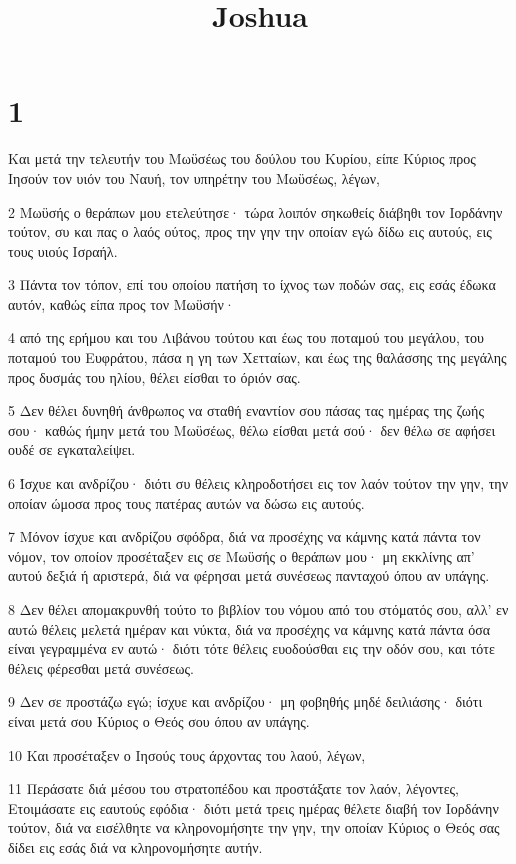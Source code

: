 

\title{Joshua}


\chapter{1}

\par Και μετά την τελευτήν του Μωϋσέως του δούλου του Κυρίου, είπε Κύριος προς Ιησούν τον υιόν του Ναυή, τον υπηρέτην του Μωϋσέως, λέγων,
\par 2 Μωϋσής ο θεράπων μου ετελεύτησε· τώρα λοιπόν σηκωθείς διάβηθι τον Ιορδάνην τούτον, συ και πας ο λαός ούτος, προς την γην την οποίαν εγώ δίδω εις αυτούς, εις τους υιούς Ισραήλ.
\par 3 Πάντα τον τόπον, επί του οποίου πατήση το ίχνος των ποδών σας, εις εσάς έδωκα αυτόν, καθώς είπα προς τον Μωϋσήν·
\par 4 από της ερήμου και του Λιβάνου τούτου και έως του ποταμού του μεγάλου, του ποταμού του Ευφράτου, πάσα η γη των Χετταίων, και έως της θαλάσσης της μεγάλης προς δυσμάς του ηλίου, θέλει είσθαι το όριόν σας.
\par 5 Δεν θέλει δυνηθή άνθρωπος να σταθή εναντίον σου πάσας τας ημέρας της ζωής σου· καθώς ήμην μετά του Μωϋσέως, θέλω είσθαι μετά σού· δεν θέλω σε αφήσει ουδέ σε εγκαταλείψει.
\par 6 Ίσχυε και ανδρίζου· διότι συ θέλεις κληροδοτήσει εις τον λαόν τούτον την γην, την οποίαν ώμοσα προς τους πατέρας αυτών να δώσω εις αυτούς.
\par 7 Μόνον ίσχυε και ανδρίζου σφόδρα, διά να προσέχης να κάμνης κατά πάντα τον νόμον, τον οποίον προσέταξεν εις σε Μωϋσής ο θεράπων μου· μη εκκλίνης απ' αυτού δεξιά ή αριστερά, διά να φέρησαι μετά συνέσεως πανταχού όπου αν υπάγης.
\par 8 Δεν θέλει απομακρυνθή τούτο το βιβλίον του νόμου από του στόματός σου, αλλ' εν αυτώ θέλεις μελετά ημέραν και νύκτα, διά να προσέχης να κάμνης κατά πάντα όσα είναι γεγραμμένα εν αυτώ· διότι τότε θέλεις ευοδούσθαι εις την οδόν σου, και τότε θέλεις φέρεσθαι μετά συνέσεως.
\par 9 Δεν σε προστάζω εγώ; ίσχυε και ανδρίζου· μη φοβηθής μηδέ δειλιάσης· διότι είναι μετά σου Κύριος ο Θεός σου όπου αν υπάγης.
\par 10 Και προσέταξεν ο Ιησούς τους άρχοντας του λαού, λέγων,
\par 11 Περάσατε διά μέσου του στρατοπέδου και προστάξατε τον λαόν, λέγοντες, Ετοιμάσατε εις εαυτούς εφόδια· διότι μετά τρεις ημέρας θέλετε διαβή τον Ιορδάνην τούτον, διά να εισέλθητε να κληρονομήσητε την γην, την οποίαν Κύριος ο Θεός σας δίδει εις εσάς διά να κληρονομήσητε αυτήν.
